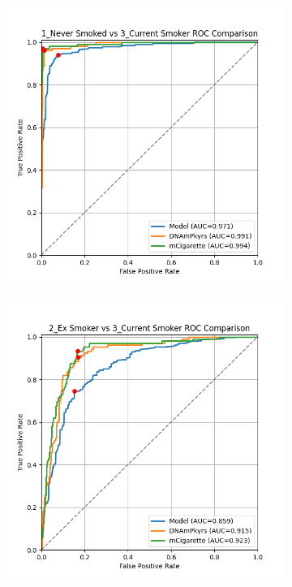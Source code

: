 \documentclass{article}
\begin{document}
\begin{figure}
    \centering
    \begin{subfigure}{0.48\textwidth}
        \centering
        \includegraphics[width=\linewidth]{comparison_1v3_roc.png}
    \end{subfigure}
    \hfill
    \begin{subfigure}{0.48\textwidth}
        \centering
        \includegraphics[width=\linewidth]{comparison_2v3_roc.png}

\end{subfigure}
\end{figure}
\end{document}
